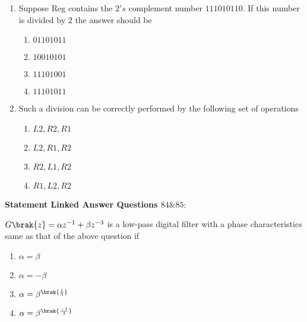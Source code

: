 \begin{enumerate}[start=82]
    \item Suppose Reg contains the $2\prime s$ complement number $111010110.$ If this number is divided by $2$ the answer should be
    \begin{enumerate}
        \item $01101011$
        \item $10010101$
        \item $11101001$
        \item $11101011$
    \end{enumerate}
    \item Such a division can be correctly performed by the following set of operations
    \begin{enumerate}
        \item $L2,R2,R1$
        \item $L2,R1,R2$
        \item $R2,L1,R2$
        \item $R1,L2,R2$
    \end{enumerate}
\end{enumerate}
\textbf{Statement Linked Answer Questions $84 \& 85:$}\\
    \item $G\brak{z}=\alpha z^{-1}+\beta z^{-3}$ is a low-pass digital filter with a phase characteristics same as that of the above question if
    \begin{enumerate}
        \item $\alpha =\beta$
        \item $\alpha =-\beta$
        \item $\alpha =\beta^{\brak{\frac{1}{3}}}$
        \item $\alpha =\beta^{\brak{\frac{-1}{3}}}$
    \end{enumerate}
%

